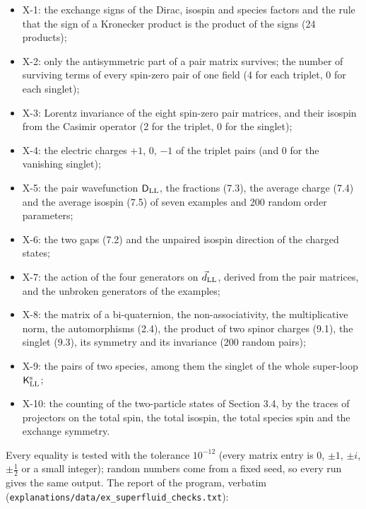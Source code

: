 \documentclass[
  10pt,
]{article}
\providecommand{\tightlist}{%
  \setlength{\itemsep}{0pt}\setlength{\parskip}{0pt}}
\begin{document}
\begin{itemize}
\tightlist
\item
  X-1: the exchange signs of the Dirac, isospin and species factors and
  the rule that the sign of a Kronecker product is the product of the
  signs (24 products);
\item
  X-2: only the antisymmetric part of a pair matrix survives; the number
  of surviving terms of every spin-zero pair of one field (4 for each
  triplet, 0 for each singlet);
\item
  X-3: Lorentz invariance of the eight spin-zero pair matrices, and
  their isospin from the Casimir operator (2 for the triplet, 0 for the
  singlet);
\item
  X-4: the electric charges \(+1\), 0, \(-1\) of the triplet pairs (and
  0 for the vanishing singlet);
\item
  X-5: the pair wavefunction \(\mathsf D_{\rm LL}\), the fractions
  (7.3), the average charge (7.4) and the average isospin (7.5) of seven
  examples and 200 random order parameters;
\item
  X-6: the two gaps (7.2) and the unpaired isospin direction of the
  charged states;
\item
  X-7: the action of the four generators on \(\vec d_{\rm LL}\), derived
  from the pair matrices, and the unbroken generators of the examples;
\item
  X-8: the matrix of a bi-quaternion, the non-associativity, the
  multiplicative norm, the automorphisms (2.4), the product of two
  spinor charges (9.1), the singlet (9.3), its symmetry and its
  invariance (200 random pairs);
\item
  X-9: the pairs of two species, among them the singlet of the whole
  super-loop \(\mathsf K^{\rm s}_{\rm LL}\);
\item
  X-10: the counting of the two-particle states of Section 3.4, by the
  traces of projectors on the total spin, the total isospin, the total
  species spin and the exchange symmetry.
\end{itemize}

Every equality is tested with the tolerance \(10^{-12}\) (every matrix
entry is \(0\), \(\pm1\), \(\pm i\), \(\pm\tfrac12\) or a small
integer); random numbers come from a fixed seed, so every run gives the
same output. The report of the program, verbatim
(\texttt{explanations/data/ex\_superfluid\_checks.txt}):
\end{document}
